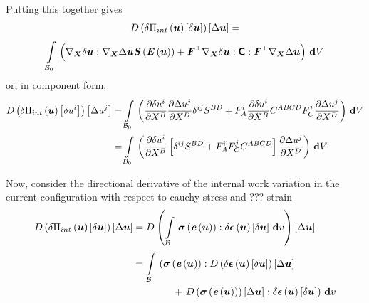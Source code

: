 Putting this together gives
\begin{multline}
  \directionalderiv{}{\variation{\fnof{\Pi_{int}}{\vectr{u}}}{\vectr{u}}}{\linearisationdir{\vectr{u}}}=\\
  \gint{\embedmanifold{B}_{0}}{}{\pbrac{\doubledotprod{\gradient{\vectr{X}}{\variationdir{\vectr{u}}}}{\gradient{\vectr{X}}{\linearisationdir{\vectr{u}}}\fnof{\tensor{S}}{\fnof{\tensor{E}}{\vectr{u}}}}+\doubledotprod{\transpose{\tensortwo{F}}\gradient{\vectr{X}}{\variationdir{\vectr{u}}}}{\doubledotprod{\tensorfour{C}}{\transpose{\tensortwo{F}}\gradient{\vectr{X}}{\linearisationdir{\vectr{u}}}}}}}{V}
\end{multline}
or, in component form,
\begin{equation}
  \begin{split}
    \directionalderiv{}{\variation{\fnof{\Pi_{int}}{\vectr{u}}}{u^{i}}}{\linearisationdir{u^{j}}}
    &=\gint{\embedmanifold{B}_{0}}{}{\pbrac{\delby{\variationdir{
            u^{i}}}{X^{B}}\delby{\linearisationdir{u^{j}}}{X^{D}}\contrakronecker{i}{j}S^{BD}+F^{i}_{A}\delby{\variationdir{
            u^{i}}}{X^{B}}C^{ABCD}F^{j}_{C}\delby{\linearisationdir{u^{j}}}{X^{D}}}}{V}\\
    &=\gint{\embedmanifold{B}_{0}}{}{\pbrac{\delby{\variationdir{u^{i}}}{X^{B}}\sqbrac{\contrakronecker{i}{j}S^{BD}+F^{i}_{A}F^{j}_{C}C^{ABCD}}\delby{\linearisationdir{u^{j}}}{X^{D}}}}{V}
  \end{split}
\end{equation}

Now, consider the directional derivative of the internal work variation in the current
configuration \ie with respect to cauchy stress and ??? strain
\begin{equation}
  \begin{split}
    \directionalderiv{}{\variation{\fnof{\Pi_{int}}{\vectr{u}}}{\vectr{u}}}{\linearisationdir{\vectr{u}}}
    &=\directionalderiv{}{\gint{\embedmanifold{B}}{}{\doubledotprod{\fnof{\tensor{\sigma}}{
            \fnof{\tensor{e}}{\vectr{u}}}}{\variation{\fnof{\tensor{\epsilon}}{\vectr{u}}}{\vectr{u}}}}{v}}{\linearisationdir{\vectr{u}}}\\
    &=\gint{\embedmanifold{B}}{}{\left(\doubledotprod{\fnof{\tensor{\sigma}}{
          \fnof{\tensor{e}}{\vectr{u}}}}{\directionalderiv{}{\variation{\fnof{\tensor{\epsilon}}{\vectr{u}}}{\vectr{u}}}{\linearisationdir{\vectr{u}}}}\right.\\
     & \qquad\qquad + \left.\doubledotprod{\directionalderiv{}{\fnof{\tensor{\sigma}}{
            \fnof{\tensor{e}}{\vectr{u}}}}{\linearisationdir{\vectr{u}}}}{\variation{\fnof{\tensor{\epsilon}}{\vectr{u}}}{\vectr{u}}}\right)}{v}
  \end{split}
\end{equation}


